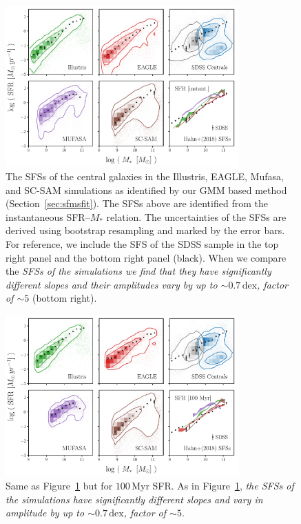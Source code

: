 \documentclass[tighten, preprint]{aastex62}
\begin{document}
\begin{figure}
\begin{center}
\includegraphics[width = 0.8\textwidth]{Catalogs_SFMSfit_SFRinst.pdf} 
\caption{The SFSs of the central galaxies in the Illustris, EAGLE, {\sc Mufasa}, 
    and SC-SAM simulations as identified by our GMM based method (Section~\ref{sec:sfmsfit}).
    The SFSs above are identified from the instantaneous SFR--$M_*$ relation. 
    The uncertainties of the SFSs are derived using bootstrap resampling 
    and marked by the error bars. For reference, we include the SFS of the SDSS 
    sample in the top right panel and the bottom right panel (black). 
    When we compare the \emph{SFSs of the simulations we find that they have significantly different slopes and their amplitudes vary by up to ${\sim}0.7\,\mathrm{dex}$, 
    factor of ${\sim}5$} 
    (bottom right).} \label{fig:sfmsfit_inst}
\end{center}
\end{figure}

\begin{figure}
\begin{center}
\includegraphics[width = 0.8\textwidth]{Catalogs_SFMSfit_SFR100myr.pdf} 
    \caption{Same as Figure~\ref{fig:sfmsfit_inst} but for $100\,\mathrm{Myr}$ SFR. 
    As in Figure~\ref{fig:sfmsfit_inst}, \emph{the SFSs of the simulations 
    have significantly different slopes and vary in amplitude by
    up to ${\sim}0.7\,\mathrm{dex}$, factor of ${\sim}5$}.}\label{fig:sfmsfit_100myr}
\end{center}
\end{figure}
\end{document}
